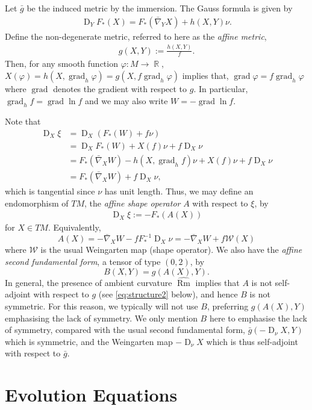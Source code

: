 \documentclass{amsart}
\theoremstyle{definition}
\theoremstyle{remark}
\DeclareMathOperator{\grad}{grad}
\DeclareMathOperator{\Rm}{Rm}
\DeclareMathOperator{\D}{D}
\DeclareMathOperator{\RR}{\mathbb{R}}
\numberwithin{equation}{section}
\begin{document}
Let $\bar{g}$ be the induced metric by the immersion. The Gauss formula is given by
\begin{align}\label{gauss equ}
\D_YF_{\ast}(X)=F_{\ast}(\bar{\nabla}_YX)+h(X,Y)\nu.
\end{align}
Define the non-degenerate metric, referred to here as the \emph{affine metric},
\begin{align}
g(X,Y):=\frac{h(X,Y)}{ f }.
\end{align}
Then, for any smooth function $\varphi : M \to \RR$, $X(\varphi) = h(X, \grad_h \varphi) = g(X, f \grad_h \varphi)$ implies that, $\grad \varphi = f \grad_h \varphi$ where $\grad$ denotes the gradient with respect to $g$. In particular, $\grad_h f = \grad \ln f$ and we may also write $W = -\grad \ln f$.

Note that
\begin{align*}
\D_X \xi &= \D_X (F_{\ast}(W) + f \nu) \\
&= \D_X F_{\ast}(W) + X(f)\nu + f \D_X \nu \\
&= F_{\ast}(\bar{\nabla}_X W) - h(X, \grad_h f) \nu + X(f) \nu + f \D_X \nu \\
&= F_{\ast} (\bar{\nabla}_X W) + f \D_X \nu,
\end{align*}
which is tangential since $\nu$ has unit length. Thus, we may define an endomorphism of $TM$, the \emph{affine shape operator} $A$ with respect to $\xi$, by
\begin{align}
\D_X\xi := -F_{\ast}(A(X))
\end{align}
for $X\in TM$. Equivalently,
\[
A(X) =- \bar{\nabla}_X W - f F_{\ast}^{-1} \D_X \nu = -\bar{\nabla}_X W + f \mathcal{W} (X)
\]
where $\mathcal{W}$ is the usual Weingarten map (shape operator). We also have the \emph{affine second fundamental form}, a tensor of type $(0, 2)$, by
\[
B(X, Y) = g(A(X), Y).
\]
In general, the presence of ambient curvature $\widehat{\Rm}$ implies that $A$ is not self-adjoint with respect to $g$ (see \eqref{eq:structure2} below), and hence $B$ is not symmetric. For this reason, we typically will not use $B$, preferring $g(A(X), Y)$ emphasising the lack of symmetry. We only mention $B$ here to emphasise the lack of symmetry, compared with the usual second fundamental form, $\bar{g}(-\D_{\nu} X, Y)$ which is symmetric, and the Weingarten map $-\D_{\nu} X$ which is thus self-adjoint with respect to $\bar{g}$.

\section{Evolution Equations}
\end{document}
